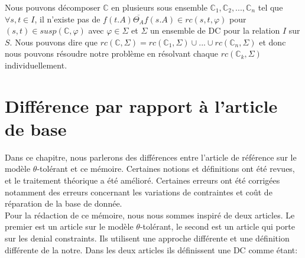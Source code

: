 \documentclass[letterpaper, 12pt]{report}
\theoremstyle{definition}
\newcommand{\C}{\mathbb{C}}
\begin{document}
Nous pouvons décomposer $\C$ en plusieurs sous ensemble $\C_1 , \C_2,...,\C_n$ tel que $\forall s,t \in I$, il n'existe pas de $f(t.A) \overline{\Theta_A} f(s.A) \in rc(s,t,\varphi)$ pour $(s,t) \in susp(\C,\varphi)$ avec $\varphi \in \Sigma$ et $\Sigma$ un ensemble de DC pour la relation $I$ sur $S$. Nous pouvons dire que $rc(\C,\Sigma) = rc(\C_1,\Sigma) \cup ... \cup rc(\C_n,\Sigma) $ et donc nous pouvons résoudre notre problème en résolvant chaque $rc(\C_k , \Sigma)$ individuellement.

%
%
%
%
%    
%     
%
%

\chapter{Différence par rapport à l'article de base}

Dans ce chapitre, nous parlerons des différences entre l'article de référence sur le modèle $\theta$-tolérant et ce mémoire. Certaines notions et définitions ont été revues, et le traitement théorique a été amélioré. Certaines erreurs ont été corrigées notamment des erreurs concernant les variations de contraintes et coût de réparation de la base de donnée.\\

Pour la rédaction de ce mémoire, nous nous sommes inspiré de deux articles. Le premier est un article sur le modèle $\theta$-tolérant, le second est un article qui porte sur les denial constraints. Ils utilisent une approche différente et une définition différente de la notre. Dans les deux articles \cite{main,DCs} ils définissent une DC comme étant:
\end{document}
